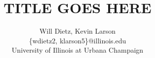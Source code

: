 \documentclass[letterpaper,twocolumn,12pt]{article}
\title{TITLE GOES HERE}
\author{Will Dietz, Kevin Larson\\
\{wdietz2, klarson5\}@illinois.edu\\
University of Illinois at Urbana Champaign}
\date{}
\begin{document}
\maketitle







\footnotesize


\end{document}
